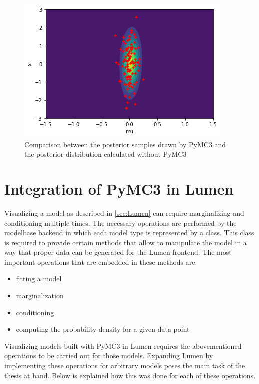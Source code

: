 \documentclass{article}
\begin{document}
\begin{figure}
	\includegraphics[width=\textwidth]{images/PyMC3_joint_posterior_samples_simple_model_2.png}
	\caption[Comparison between the posterior samples drawn by PyMC3 and the posterior distribution calculated without PyMC3]{Comparison between the posterior samples drawn by PyMC3 and the posterior distribution calculated without PyMC3}
	\label{fig:PyMC3_joint_posterior_samples_simple_model}
\end{figure}



\section{Integration of PyMC3 in Lumen}
\label{sec:lumen_pymc3_integration}
Visualizing a model as described in \autoref{sec:Lumen} can require marginalizing and conditioning multiple times. The necessary operations are performed by the modelbase backend in which each model type is represented by a class. This class is required to provide certain methods that allow to manipulate the model in a way that proper data can be generated for the Lumen frontend. The most important operations that are embedded in these methods are:
\begin{itemize}
	\item fitting a model
	\item marginalization
	\item conditioning
	\item computing the probability density for a given data point
\end{itemize}
Visualizing models built with PyMC3 in Lumen requires the abovementioned operations to be carried out for those models. Expanding Lumen by implementing these operations for arbitrary models poses the main task of the thesis at hand. Below is explained how this was done for each of these operations.
\end{document}
